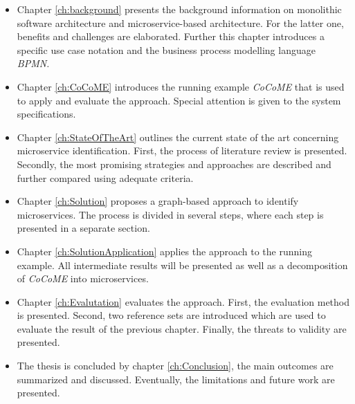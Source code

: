 \begin{itemize}
	\item  Chapter \ref{ch:background} presents the background information on monolithic software architecture and microservice-based architecture. For the latter one, benefits and challenges are elaborated. Further this chapter introduces a specific use case notation and the business process modelling language \textit{BPMN.}
	\item Chapter \ref{ch:CoCoME} introduces the running example \textit{CoCoME} that is used to apply and evaluate the approach. Special attention is given to the system specifications.
	\item Chapter \ref{ch:StateOfTheArt} outlines the current state of the art concerning microservice identification. First, the process of literature review is presented. Secondly, the most promising strategies and approaches are described and further compared using adequate criteria.
	\item Chapter \ref{ch:Solution} proposes a graph-based approach to identify microservices. The process is divided in several steps, where each step is presented in a separate section.
	\item Chapter \ref{ch:SolutionApplication} applies the approach to the running example. All intermediate results will be presented as well as a decomposition of \textit{CoCoME} into microservices.
    \item Chapter \ref{ch:Evalutation} evaluates the approach. First, the evaluation method is presented. Second, two reference sets are introduced which are used to evaluate the result of the previous chapter. Finally, the threats to validity are presented.
    \item The thesis is concluded by chapter \ref{ch:Conclusion}, the main outcomes are summarized and discussed. Eventually, the limitations and future work are presented.
    

\end{itemize}











